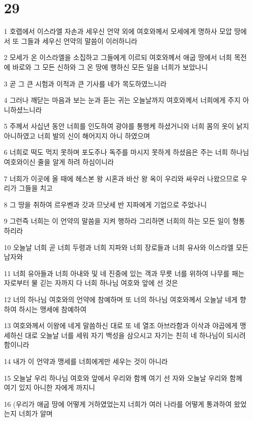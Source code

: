 \chapter{29}

\par 1 호렙에서 이스라엘 자손과 세우신 언약 외에 여호와께서 모세에게 명하사 모압 땅에서 또 그들과 세우신 언약의 말씀이 이러하니라
\par 2 모세가 온 이스라엘을 소집하고 그들에게 이르되 여호와께서 애굽 땅에서 너희 목전에 바로와 그 모든 신하와 그 온 땅에 행하신 모든 일을 너희가 보았나니
\par 3 곧 그 큰 시험과 이적과 큰 기사를 네가 목도하였느니라
\par 4 그러나 깨닫는 마음과 보는 눈과 듣는 귀는 오늘날까지 여호와께서 너희에게 주지 아니하셨느니라
\par 5 주께서 사십년 동안 너희를 인도하여 광야를 통행케 하셨거니와 너희 몸의 옷이 낡지 아니하였고 너희 발의 신이 해어지지 아니 하였으며
\par 6 너희로 떡도 먹지 못하며 포도주나 독주를 마시지 못하게 하셨음은 주는 너희 하나님 여호와이신 줄을 알게 하려 하심이니라
\par 7 너희가 이곳에 올 때에 헤스본 왕 시혼과 바산 왕 옥이 우리와 싸우러 나왔으므로 우리가 그들을 치고
\par 8 그 땅을 취하여 르우벤과 갓과 므낫세 반 지파에게 기업으로 주었나니
\par 9 그런즉 너희는 이 언약의 말씀을 지켜 행하라 그리하면 너희의 하는 모든 일이 형통하리라
\par 10 오늘날 너희 곧 너희 두령과 너희 지파와 너희 장로들과 너희 유사와 이스라엘 모든 남자와
\par 11 너희 유아들과 너희 아내와 및 네 진중에 있는 객과 무릇 너를 위하여 나무를 패는 자로부터 물 긷는 자까지 다 너희 하나님 여호와 앞에 선 것은
\par 12 너의 하나님 여호와의 언약에 참예하며 또 너의 하나님 여호와께서 오늘날 네게 향하여 하시는 맹세에 참예하여
\par 13 여호와께서 이왕에 네게 말씀하신 대로 또 네 열조 아브라함과 이삭과 야곱에게 맹세하신 대로 오늘날 너를 세워 자기 백성을 삼으시고 자기는 친히 네 하나님이 되시려 함이니라
\par 14 내가 이 언약과 맹세를 너희에게만 세우는 것이 아니라
\par 15 오늘날 우리 하나님 여호와 앞에서 우리와 함께 여기 선 자와 오늘날 우리와 함께 여기 있지 아니한 자에게 까지니
\par 16 (우리가 애굽 땅에 어떻게 거하였었는지 너희가 여러 나라를 어떻게 통과하여 왔었는지 너희가 알며
